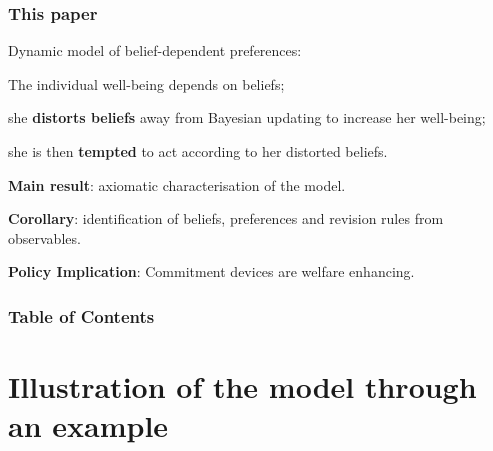 \documentclass[usenames,dvipsnames,aspectratio=169,11pt]{beamer}
\begin{document}
\begin{frame}\frametitle{This paper}

	Dynamic model of belief-dependent preferences:

	\vfill

	\begin{wideitemize}
		\item The individual well-being depends on beliefs;
		\item she \textbf{distorts beliefs} away from Bayesian updating to increase her well-being;
		\item she is then \textbf{tempted} to act according to her distorted beliefs.
	\end{wideitemize}

	\vfill \pause

	\textbf{Main result}: axiomatic characterisation of the model.

	\vfill \pause

	\textbf{Corollary}: identification of beliefs, preferences and revision rules from observables.

	\vfill \pause

	\textbf{Policy Implication}: Commitment devices are welfare enhancing.

\end{frame}

\begin{frame}\frametitle{Table of Contents}

	\tableofcontents

\end{frame}

\section{Illustration of the model through an example}
\end{document}
